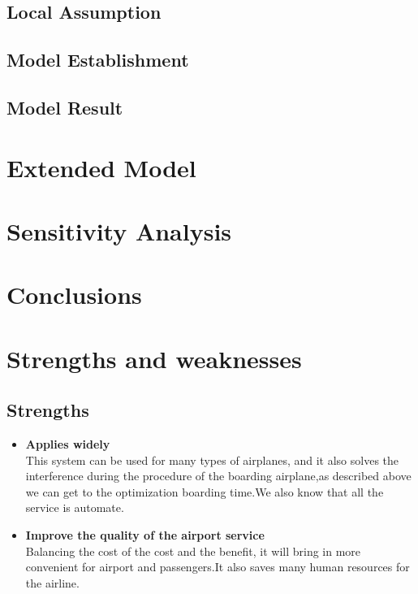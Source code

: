 \documentclass{mcmthesis}
\begin{document}
\subsection{Local Assumption}

\subsection{Model Establishment}

\subsection{Model Result}

\section{Extended Model}

\section{Sensitivity Analysis}

\section{Conclusions}

\section{Strengths and weaknesses}

\subsection{Strengths}
\begin{itemize}
\item \textbf{Applies widely}\\
This  system can be used for many types of airplanes, and it also
solves the interference during  the procedure of the boarding
airplane,as described above we can get to the  optimization
boarding time.We also know that all the service is automate.
\item \textbf{Improve the quality of the airport service}\\
Balancing the cost of the cost and the benefit, it will bring in
more convenient  for airport and passengers.It also saves many
human resources for the airline.
\end{itemize}
\end{document}

